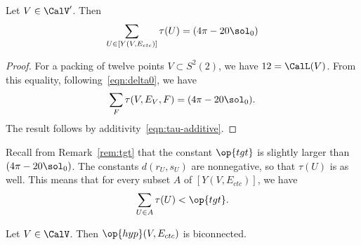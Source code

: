 \begin{lemma}[] Let $V\in \CalV'$.  Then
\[
\sum_{U\in [Y(V,E_{ctc})]} \tau(U) = (4\pi - 20\sol_0)
\]
\end{lemma}

%
\begin{proof} For a packing of twelve points $V\subset S^2(2)$, we have
$12=\CalL(V)$.   From this equality, following~\eqref{eqn:delta0}, we have
\[
  \sum_F \tau (V,E_{V},F) = (4\pi - 20\sol_0). 
\]
The result follows by additivity~\eqref{eqn:tau-additive}.
\end{proof}

Recall from Remark~\ref{rem:tgt} that the constant $\op{tgt}$ is slightly
larger than $(4\pi-20\sol_0)$.  The constants $d(r_U,s_U)$ are nonnegative, so that
$\tau(U)$ is as well.  This means that for every subset
$A$ of $[Y(V,E_{ctc})]$, we have
\begin{equation}\label{eqn:subtgt}
\sum_{U\in A} \tau(U) < \op{tgt}.
\end{equation}



\begin{lemma}[biconnected]\label{lemma:biconnected}
  Let $V\in \CalV$.  Then $\op{hyp}(V,E_{ctc})$ is biconnected.
\end{lemma}

